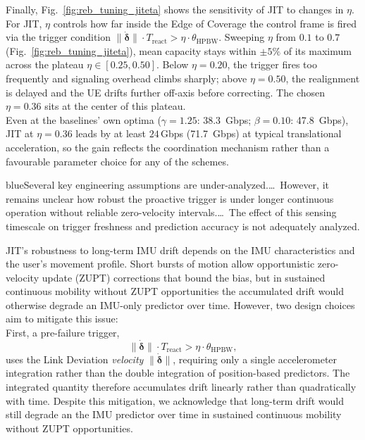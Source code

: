 \documentclass{article}
\newcommand{\blue}[1]{\begin{color}{blue}#1\end{color}}
\begin{document}
\noindent Finally, Fig.~\ref{fig:reb_tuning_jiteta} shows the sensitivity of JIT to changes in $\eta$. For JIT, $\eta$ controls how far inside the Edge of Coverage the control frame is fired via the trigger condition $\|\dot{\boldsymbol{\delta}}\| \cdot T_{\text{react}} > \eta \cdot \theta_{\text{HPBW}}$. Sweeping $\eta$ from $0.1$ to $0.7$ (Fig.~\ref{fig:reb_tuning_jiteta}), mean capacity stays within $\pm 5\%$ of its maximum across the plateau $\eta \in [0.25, 0.50]$. Below $\eta = 0.20$, the trigger fires too frequently and signaling overhead climbs sharply; above $\eta = 0.50$, the realignment is delayed and the UE drifts further off-axis before correcting. The chosen $\eta = 0.36$ sits at the center of this plateau.\\

\noindent Even at the baselines' own optima ($\gamma = 1.25$: \SI{38.3}{Gbps}; $\beta = 0.10$: \SI{47.8}{Gbps}), JIT at $\eta = 0.36$ leads by at least $24$\,Gbps (\SI{71.7}{Gbps}) at typical translational acceleration, so the gain reflects the coordination mechanism rather than a favourable parameter choice for any of the schemes.

\begin{tcbremark}
{\selectfont
\blue{Several key engineering assumptions are under-analyzed.\dots\ However, it remains unclear how robust the proactive trigger is under longer continuous operation without reliable zero-velocity intervals.\dots\ The effect of this sensing timescale on trigger freshness and prediction accuracy is not adequately analyzed.}
}
\end{tcbremark}

\noindent JIT's robustness to long-term IMU drift depends on the IMU characteristics and the user's movement profile. Short bursts of motion allow opportunistic zero-velocity update (ZUPT) corrections that bound the bias, but in sustained continuous mobility without ZUPT opportunities the accumulated drift would otherwise degrade an IMU-only predictor over time. However, two design choices aim to mitigate this issue:\\

\noindent First, a pre-failure trigger,
\begin{equation}
    \|\dot{\boldsymbol{\delta}}\| \cdot T_{\text{react}} > \eta \cdot \theta_{\text{HPBW}}, \tag{Eq.~7}
\end{equation}
uses the Link Deviation \emph{velocity} $\|\dot{\boldsymbol{\delta}}\|$, requiring only a single accelerometer integration rather than the double integration of position-based predictors. The integrated quantity therefore accumulates drift linearly rather than quadratically with time. Despite this mitigation, we acknowledge that long-term drift would still degrade an the IMU predictor over time in sustained continuous mobility without ZUPT opportunities. 
\end{document}
